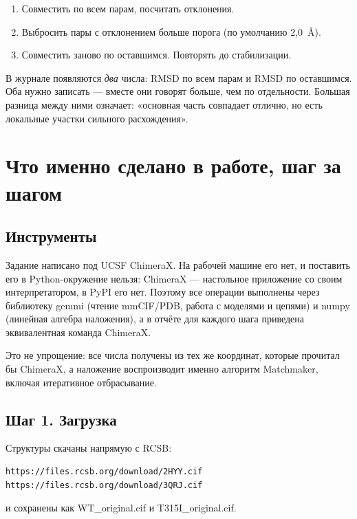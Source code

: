 \documentclass[12pt,a4paper]{article}
\newcommand{\code}[1]{{\ttfamily #1}}
\begin{document}
\begin{enumerate}[leftmargin=*,topsep=2pt,itemsep=2pt]
\item Совместить по всем парам, посчитать отклонения.
\item Выбросить пары с отклонением больше порога (по умолчанию 2{,}0~\AA).
\item Совместить заново по оставшимся. Повторять до стабилизации.
\end{enumerate}

В журнале появляются \emph{два} числа: RMSD по всем парам и RMSD по оставшимся.
Оба нужно записать --- вместе они говорят больше, чем по отдельности. Большая
разница между ними означает: «основная часть совпадает отлично, но есть локальные
участки сильного расхождения».

\section{Что именно сделано в работе, шаг за шагом}

\subsection{Инструменты}

Задание написано под UCSF ChimeraX. На рабочей машине его нет, и поставить его в
Python-окружение нельзя: ChimeraX --- настольное приложение со своим
интерпретатором, в PyPI его нет. Поэтому все операции выполнены через библиотеку
\code{gemmi} (чтение mmCIF/PDB, работа с моделями и цепями) и \code{numpy}
(линейная алгебра наложения), а в отчёте для каждого шага приведена эквивалентная
команда ChimeraX.

Это не упрощение: все числа получены из тех же координат, которые прочитал бы
ChimeraX, а наложение воспроизводит именно алгоритм Matchmaker, включая итеративное
отбрасывание.

\subsection{Шаг 1. Загрузка}

Структуры скачаны напрямую с RCSB:

\begin{lstlisting}
https://files.rcsb.org/download/2HYY.cif
https://files.rcsb.org/download/3QRJ.cif
\end{lstlisting}

и сохранены как \code{WT\_original.cif} и \code{T315I\_original.cif}.
\end{document}
